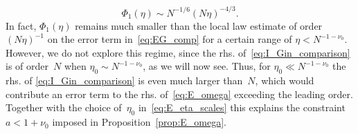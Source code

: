 \documentclass[10pt]{amsart}
\numberwithin{equation}{section}
\begin{document}
\begin{equation}
\Phi_1(\eta)\sim N^{-1/6}(N\eta)^{-4/3}.
\label{eq:Phi1_bound2}
\end{equation}
In fact, $\Phi_1(\eta)$ remains much smaller than the local law estimate of order $(N\eta)^{-1}$ on the error term in~\eqref{eq:EG_comp} for a certain range of $\eta<N^{-1-\nu_0}$. However, we do not explore this regime, since the rhs. of~\eqref{eq:I_Gin_comparison} is of order~$N$ when $\eta_0\sim N^{-1-\nu_0}$, as we will now see. Thus, for $\eta_0\ll N^{-1-\nu_0}$ the rhs. of \eqref{eq:I_Gin_comparison} is even much larger than~$N$, which would contribute an error term to the rhs. of~\eqref{eq:E_omega} exceeding the leading order. Together with the choice of~$\eta_0$ in~\eqref{eq:E_eta_scales} this explains the constraint $a<1+\nu_0$ imposed in Proposition~\ref{prop:E_omega}.
\end{document}
